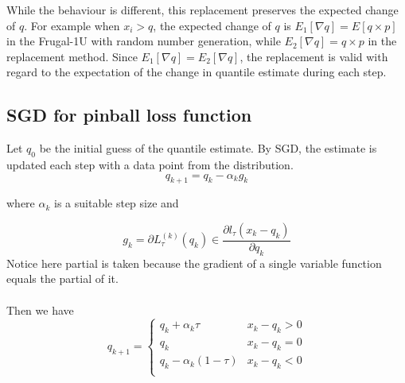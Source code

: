 \begin{enumerate}
    While the behaviour is different, this replacement preserves the expected change of $q$. 
    For example when $x_i > q$, 
    the expected change of $q$ is
    $E_1[\nabla q] = E[q \times p]$ in the Frugal-1U with 
    random number generation,
    while 
    $E_2[\nabla q] = q \times p$ in the replacement method.
    Since $E_1[\nabla q] = E_2[\nabla q]$, the replacement is valid
    with regard to the expectation of the change in quantile estimate during each step.

\end{enumerate}


\subsection{SGD for pinball loss function}
Let $q_0$ be the initial guess of the quantile estimate. 
By SGD, the estimate is updated each step with a data point from the distribution.
\begin{equation}
    q_{k+1} = q_k - \alpha_k g_k
\end{equation}

where $ \alpha_k $ is a suitable step size and 

\begin{equation}
    g_k = \partial L_{\tau}^{(k)}(q_k) \in \frac{\partial l_\tau(x_k - q_k)}{\partial q_k}
\end{equation}
{Notice here partial is taken because the gradient of a single variable function equals the partial of it.}
\\\\
Then we have
\begin{equation*}
    q_{k+1} = 
    \begin{cases}
        q_k + \alpha_k \tau               & x_k - q_k > 0\\
        q_k                               & x_k - q_k = 0         \\
        q_k - \alpha_k (1-\tau)           & x_k - q_k < 0\\
    \end{cases}
\end{equation*}

